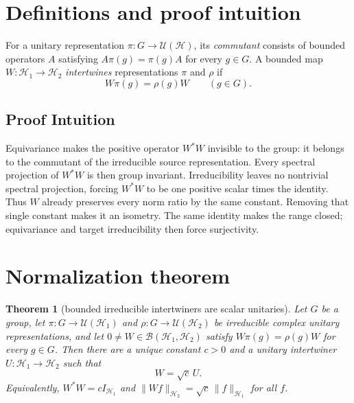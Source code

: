 \documentclass[11pt]{article}
\newtheorem{theorem}{Theorem}
\begin{document}
\section{Definitions and proof intuition}

For a unitary representation $\pi:G\to\mathcal U(\mathcal H)$, its
\emph{commutant} consists of bounded operators $A$ satisfying
$A\pi(g)=\pi(g)A$ for every $g\in G$.  A bounded map
$W:\mathcal H_1\to\mathcal H_2$ \emph{intertwines} representations $\pi$
and $\rho$ if
\[
  W\pi(g)=\rho(g)W\qquad(g\in G).
\]

\subsection*{Proof Intuition}

Equivariance makes the positive operator $W^*W$ invisible to the group:
it belongs to the commutant of the irreducible source representation.
Every spectral projection of $W^*W$ is then group invariant.  Irreducibility
leaves no nontrivial spectral projection, forcing $W^*W$ to be one positive
scalar times the identity.  Thus $W$ already preserves every norm ratio by
the same constant.  Removing that single constant makes it an isometry.
The same identity makes the range closed; equivariance and target
irreducibility then force surjectivity.

\section{Normalization theorem}

\begin{theorem}[bounded irreducible intertwiners are scalar unitaries]
\label{thm:intertwiner}
Let $G$ be a group, let
$\pi:G\to\mathcal U(\mathcal H_1)$ and
$\rho:G\to\mathcal U(\mathcal H_2)$ be irreducible complex unitary
representations, and let $0\ne W\in\mathcal B(\mathcal H_1,\mathcal H_2)$
satisfy $W\pi(g)=\rho(g)W$ for every $g\in G$.  Then there are a unique
constant $c>0$ and a unitary intertwiner $U:\mathcal H_1\to\mathcal H_2$
such that
\[
  W=\sqrt c\,U.
\]
Equivalently, $W^*W=cI_{\mathcal H_1}$ and
$\|Wf\|_{\mathcal H_2}=\sqrt c\,\|f\|_{\mathcal H_1}$ for all $f$.
\end{theorem}
\end{document}
